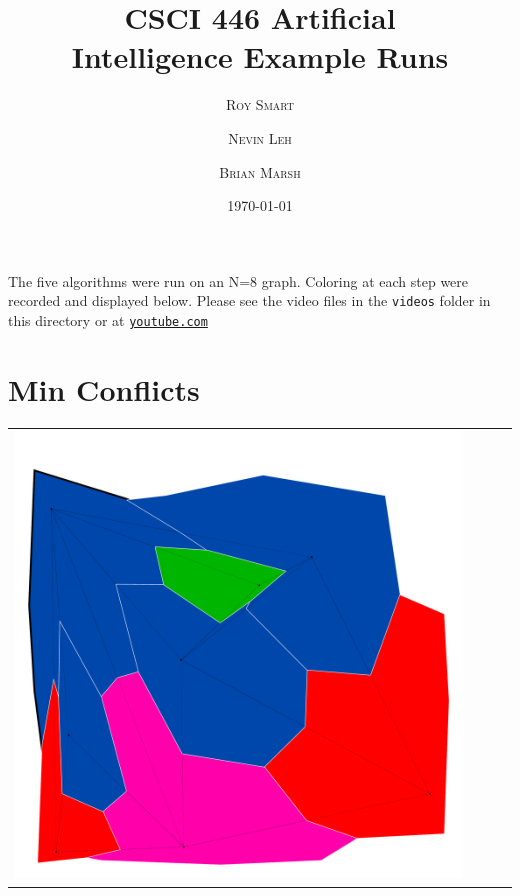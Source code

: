 \documentclass[10pt,a4paper]{article}
\title{\vspace{-15mm}\fontsize{24pt}{10pt}\selectfont\textbf{CSCI 446 Artificial \\ [2mm]Intelligence Example Runs} \\} %
\date{\today}
\author{
	\large
	\textsc{Roy Smart} \and \textsc{Nevin Leh} \and \textsc{Brian Marsh}\\[2mm] %
}
\begin{document}
	
	\maketitle %
	\thispagestyle{fancy}
	The five algorithms were run on an N=8 graph. Coloring at each step were recorded and displayed below. Please see the video files in the \texttt{videos} folder in this directory or at \href{https://www.youtube.com/playlist?list=PLiXOmiaruL8ih2YWsmPLjXUrztIMaAfSO}{\texttt{youtube.com}}
\section{Min Conflicts}


\begin{tabular}{c c c c }
	
	\includegraphics[scale=.10]{../results/min_conflicts/map_build/minconf_I00001.pdf}&

\end{tabular}
\end{document}
